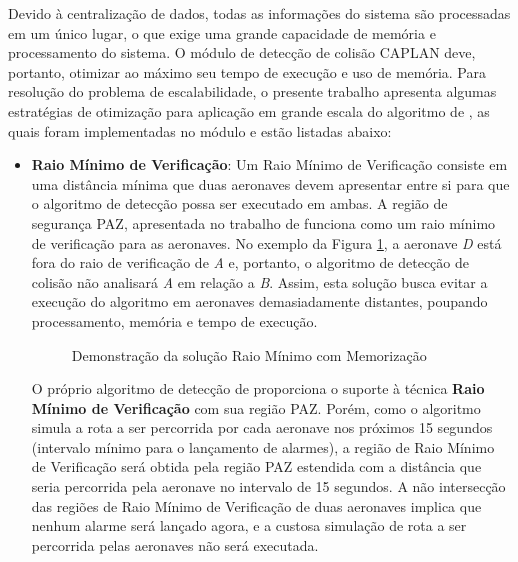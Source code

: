 Devido à centralização de dados, todas as informações do sistema são processadas em um único lugar, o que exige uma grande capacidade de memória e processamento do sistema. O módulo de detecção de colisão CAPLAN deve, portanto, otimizar ao máximo seu tempo de execução e uso de memória. Para resolução do problema de escalabilidade, o presente trabalho apresenta algumas estratégias de otimização para aplicação em grande escala do algoritmo de , as quais foram implementadas no módulo e estão listadas abaixo:

\begin{itemize}

\item \textbf{Raio Mínimo de Verificação}: Um Raio Mínimo de Verificação consiste em uma distância mínima que duas aeronaves devem apresentar entre si para que o algoritmo de detecção possa ser executado em ambas. A região de segurança PAZ, apresentada no trabalho de  funciona como um raio mínimo de verificação para as aeronaves. No exemplo da Figura \ref{raio minimo}, a aeronave \textit{D} está fora do raio de verificação de \textit{A} e, portanto, o algoritmo de detecção de colisão não analisará \textit{A} em relação a \textit{B}. Assim, esta solução busca evitar a execução do algoritmo em aeronaves demasiadamente distantes, poupando processamento, memória e tempo de execução.

\begin{figure}[H] %

\caption{\label{fig:exemplo-1} Demonstração da solução Raio Mínimo com Memorização}

    
\label{raio minimo}
\end{figure}

O próprio algoritmo de detecção de  proporciona o suporte à técnica \textbf{Raio Mínimo de Verificação} com sua região PAZ. Porém, como o algoritmo simula a rota a ser percorrida por cada aeronave nos próximos 15 segundos (intervalo mínimo para o lançamento de alarmes), a região de Raio Mínimo de Verificação será obtida pela região PAZ estendida com a distância que seria percorrida pela aeronave no intervalo de 15 segundos. A não intersecção das regiões de Raio Mínimo de Verificação de duas aeronaves implica que nenhum alarme será lançado agora, e a custosa simulação de rota a ser percorrida pelas aeronaves não será executada. 


\end{itemize}
